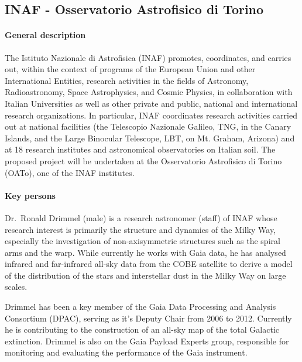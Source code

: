 \subsection{INAF - Osservatorio Astrofisico di Torino}
\label{sec:inaf}

\paragraph{General description}

The Istituto Nazionale di Astrofisica (INAF) promotes, coordinates, and carries out, within the context of programs of the European Union and other International Entities, research activities in the fields of Astronomy, Radioastronomy, Space Astrophysics, and Cosmic Physics, in collaboration with Italian Universities as well as other private and public, national and international research organizations. In particular, INAF coordinates research activities carried out at national facilities (the Telescopio Nazionale Galileo, TNG, in the Canary Islands, and the Large Binocular Telescope, LBT, on Mt. Graham, Arizona) and at 18 research institutes and astronomical observatories on Italian soil. The proposed project will be undertaken at the Osservatorio Astrofisico di Torino (OATo), one of the INAF institutes. 

\paragraph{Key persons}

Dr.~Ronald Drimmel (male) is a research astronomer (staff) of INAF whose research interest is primarily the structure and dynamics of the Milky Way, especially the investigation of non-axisymmetric structures such as the spiral arms and the warp. While currently he works with Gaia data, he has analysed infrared and far-infrared all-sky data from the COBE satellite to derive a model of the distribution of the stars and interstellar dust in the Milky Way on large scales. 

Drimmel has been a key member of the Gaia Data Processing and Analysis Consortium (DPAC), serving as it's Deputy Chair from 2006 to 2012. Currently he is contributing to the construction of an all-sky map of the total Galactic extinction. Drimmel is also on the Gaia Payload Experts group, responsible for monitoring and evaluating the performance of the Gaia instrument.

